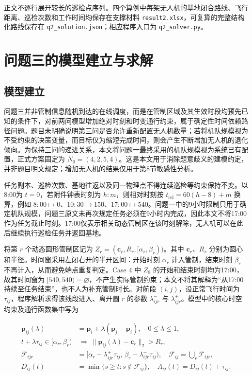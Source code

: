 \documentclass[UTF8,a4paper,12pt]{ctexart}
\numberwithin{equation}{section}
\numberwithin{equation}{section}
\begin{document}
正文不逐行展开较长的巡检点序列。四个算例中每架无人机的基地闭合路线、飞行距离、巡检次数和工作时间均保存在支撑材料 \texttt{result2.xlsx}，可复算的完整结构化路线保存在 \texttt{q2\_solution.json}；相应程序入口为 \texttt{q2\_solver.py}。

\section{问题三的模型建立与求解}
\subsection{模型建立}

问题三并非管制信息随机到达的在线调度，而是在管制区域及其生效时段均预先已知的条件下，对前两问模型增加绝对时刻和时变通行约束，属于确定性时间依赖路径问题\cite{gendreau2015time}。题目未明确说明第三问是否允许重新配置无人机数量；若将机队规模视为不受约束的决策变量，而目标仅为缩短完成时间，则会产生不断增加无人机的退化倾向。为保持三问的递进关系，本文将问题一最终采用的机队规模视为系统已有配置，正式方案固定为 $N_0=(4,2,5,4)$。这是本文用于消除题意歧义的建模约定，并非题目明文规定；增加无人机的结果仅用于第8节敏感性分析。

任务副本、巡检次数、基地往返以及同一物理点不得连续巡检等约束保持不变。以8:00为 $t=0$，若附件钟表时刻为 $h{:}m$，则相对时刻按 $t_{\mathrm{rel}}=60(h-8)+m$ 换算，例如 $8{:}00\mapsto0$、$10{:}30\mapsto150$、$17{:}00\mapsto540$。问题一中的9小时限制只用于确定机队规模，问题三原文未再次规定任务必须在9小时内完成，因此本文不将17:00作为任务截止时刻。17:00仅表示相关动态管制区在该时刻解除，无人机可以在此后继续执行巡检任务并返回基地。

将第 $r$ 个动态圆形管制区记为 $Z_r=(\boldsymbol c_r,R_r,[\alpha_r,\beta_r))$。其中 $\boldsymbol c_r$、$R_r$ 分别为圆心和半径。时间窗采用左闭右开的半开区间：开始时刻 $\alpha_r$ 计入管制，结束时刻 $\beta_r$ 不再计入，从而避免端点重复判定。Case 4 中 $Z_8$ 的开始和结束时刻均为17:00，故其时间窗为 $[540,540)=\varnothing$，不产生实际管制约束；本文不将其解释为“从17:00持续至任务结束”，也不人为补充管制时长。对航段 $(i,j)$，设正常飞行时间为 $\tau_{ij}$，程序解析求得该线段进入、离开圆 $r$ 的参数 $\lambda_{ijr}^{-}$ 与 $\lambda_{ijr}^{+}$。模型中的核心时空约束及通行函数集中写为

\begin{equation}
\begin{aligned}
 \boldsymbol p_{ij}(\lambda)&=\boldsymbol p_i+\lambda(\boldsymbol p_j-\boldsymbol p_i),\quad 0\leq\lambda\leq1,\\
 t+\lambda\tau_{ij}\in[\alpha_r,\beta_r)&\ \Longrightarrow\ 
 \|\boldsymbol p_{ij}(\lambda)-\boldsymbol c_r\|_2>R_r,\\
 \mathcal F_{ijr}&=[\alpha_r-\lambda_{ijr}^{+}\tau_{ij},\,\beta_r-\lambda_{ijr}^{-}\tau_{ij}),
 \quad \mathcal F_{ij}=\bigcup_r\mathcal F_{ijr},\\
 D_{ij}(t)&=\min\{s\geq t:s\notin\mathcal F_{ij}\},\quad
 A_{ij}(t)=D_{ij}(t)+\tau_{ij}.
\end{aligned}
\label{eq:q3-core-dynamic}
\end{equation}
\end{document}
